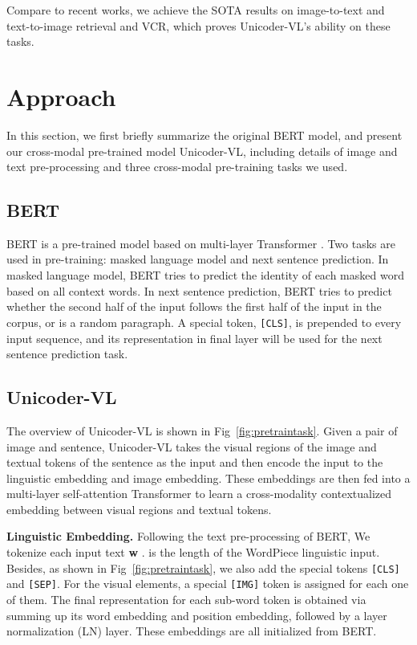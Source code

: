 \documentclass[letterpaper]{article} \usepackage{aaai20}  \usepackage{times}  \usepackage{helvet} \usepackage{courier}  \usepackage[hyphens]{url}  \usepackage{graphicx} \urlstyle{rm} \def\UrlFont{\rm}  \usepackage{graphicx}  \frenchspacing  \setlength{\pdfpagewidth}{8.5in}  \setlength{\pdfpageheight}{11in}  \usepackage{amssymb}
\begin{document}
Compare to recent works, we achieve the SOTA results on image-to-text and text-to-image retrieval and VCR, which proves Unicoder-VL's ability on these tasks.

\section{Approach}

\noindent In this section, we first briefly summarize the original BERT model, and present our cross-modal pre-trained model Unicoder-VL, including details of image and text pre-processing and three cross-modal pre-training tasks we used. 

\subsection{BERT}
BERT \cite{devlin2018bert} is a pre-trained model based on multi-layer Transformer \cite{vaswani2017attention}. Two tasks are used in pre-training: masked language model and next sentence prediction. 
In masked language model, BERT tries to predict the identity of each masked word based on all context words. 
In next sentence prediction, BERT tries to predict whether the second half of the input follows the first half of the input in the corpus, or is a random paragraph. A special token, \texttt{[CLS]}, is prepended to every input sequence, and its representation in final layer will be used for the next sentence prediction task.

\subsection{Unicoder-VL}
The overview of Unicoder-VL is shown in Fig~\ref{fig:pretraintask}. Given a pair of image and sentence, Unicoder-VL takes the visual regions of the image and textual tokens of the sentence as the input and then encode the input to the  linguistic embedding and image embedding. These embeddings are then fed into a multi-layer self-attention Transformer to learn a cross-modality contextualized embedding between visual regions and textual tokens.

\textbf{Linguistic Embedding.} Following the text pre-processing of BERT, We tokenize each input text \textbf{w} .  is the length of the WordPiece \cite{wu2016google} linguistic input. Besides, as shown in  Fig~\ref{fig:pretraintask}, we also add the special tokens \texttt{[CLS]} and \texttt{[SEP]}. For the visual elements, a special \texttt{[IMG]} token is assigned for each one of them. The final representation for each sub-word token is obtained via summing up its word embedding and position embedding, followed by a layer normalization (LN) layer. These embeddings are all initialized from BERT.
\end{document}
